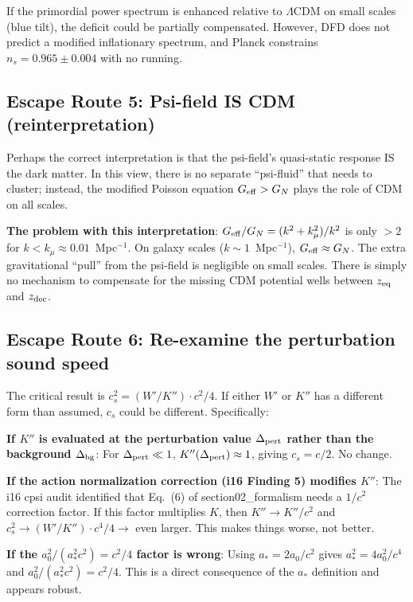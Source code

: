 \documentclass[11pt]{article}
\newcommand{\LCDM}{$\Lambda$CDM}
\newcommand{\Geff}{G_{\rm eff}}
\newcommand{\kmu}{k_\mu}
\begin{document}
If the primordial power spectrum is enhanced relative to \LCDM{} on
small scales (blue tilt), the deficit could be partially compensated.
However, DFD does not predict a modified inflationary spectrum, and
Planck constrains $n_s = 0.965 \pm 0.004$ with no running.

\subsection{Escape Route 5: Psi-field IS CDM (reinterpretation)}

Perhaps the correct interpretation is that the psi-field's quasi-static
response IS the dark matter. In this view, there is no separate
``psi-fluid'' that needs to cluster; instead, the modified Poisson
equation $\Geff > G_N$ plays the role of CDM on all scales.

\textbf{The problem with this interpretation}: $\Geff/G_N = (k^2+\kmu^2)/k^2$
is only $> 2$ for $k < \kmu \approx 0.01$~Mpc$^{-1}$. On galaxy
scales ($k \sim 1$~Mpc$^{-1}$), $\Geff \approx G_N$. The extra
gravitational ``pull'' from the psi-field is negligible on small scales.
There is simply no mechanism to compensate for the missing CDM potential
wells between $z_{\rm eq}$ and $z_{\rm dec}$.

\subsection{Escape Route 6: Re-examine the perturbation sound speed}

The critical result is $c_s^2 = (W'/K'') \cdot c^2/4$. If either
$W'$ or $K''$ has a different form than assumed, $c_s$ could be
different. Specifically:

\textbf{If $K''$ is evaluated at the perturbation value $\Delta_{\rm pert}$
rather than the background $\Delta_{\rm bg}$}: For $\Delta_{\rm pert} \ll 1$,
$K''(\Delta_{\rm pert}) \approx 1$, giving $c_s = c/2$. No change.

\textbf{If the action normalization correction (i16 Finding 5) modifies
$K''$}: The i16 cpsi audit identified that Eq.~(6) of section02\_formalism
needs a $1/c^2$ correction factor. If this factor multiplies $K$, then
$K'' \to K''/c^2$ and $c_s^2 \to (W'/K'') \cdot c^4/4 \to$ even larger.
This makes things worse, not better.

\textbf{If the $a_0^2/(a_*^2 c^2) = c^2/4$ factor is wrong}:
Using $a_* = 2a_0/c^2$ gives $a_*^2 = 4a_0^2/c^4$ and
$a_0^2/(a_*^2 c^2) = c^2/4$. This is a direct consequence of the
$a_*$ definition and appears robust.
\end{document}
